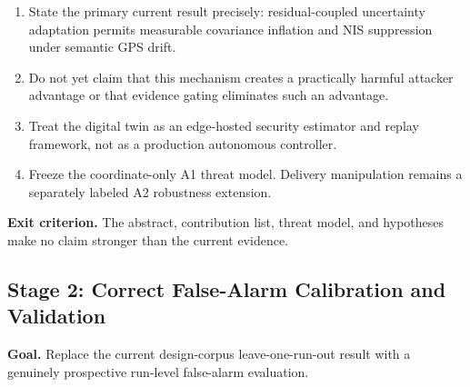 \documentclass[11pt,a4paper]{article}
\begin{document}
\begin{enumerate}
    \item State the primary current result precisely: residual-coupled
    uncertainty adaptation permits measurable covariance inflation and NIS
    suppression under semantic GPS drift.

    \item Do not yet claim that this mechanism creates a practically harmful
    attacker advantage or that evidence gating eliminates such an advantage.

    \item Treat the digital twin as an edge-hosted security estimator and
    replay framework, not as a production autonomous controller.

    \item Freeze the coordinate-only A1 threat model. Delivery manipulation
    remains a separately labeled A2 robustness extension.
\end{enumerate}

\textbf{Exit criterion.} The abstract, contribution list, threat model, and
hypotheses make no claim stronger than the current evidence.

\subsection{Stage 2: Correct False-Alarm Calibration and Validation}

\textbf{Goal.} Replace the current design-corpus leave-one-run-out result with
a genuinely prospective run-level false-alarm evaluation.
\end{document}
